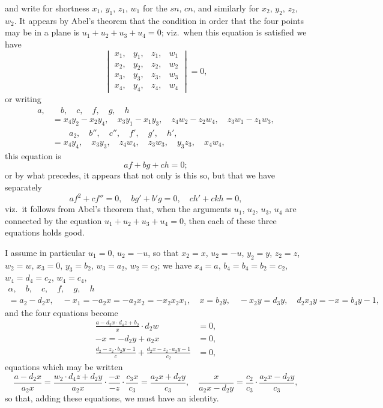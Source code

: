 \documentclass[11pt,a4paper]{book}
\begin{document}
\noindent and write for shortness $x_1$, $y_1$, $z_1$, $w_1$ for the $sn$, $cn$, and similarly for $x_2$, $y_2$, $z_2$, $w_2$. It appears by Abel's theorem that the condition in order that the four points may be in a plane is $u_1 + u_2 + u_3 + u_4 = 0$; viz.\ when this equation is satisfied we have
\[
\begin{vmatrix}
x_1, & y_1, & z_1, & w_1 \\
x_2, & y_2, & z_2, & w_2 \\
x_3, & y_3, & z_3, & w_3 \\
x_4, & y_4, & z_4, & w_4
\end{vmatrix} = 0,
\]
or writing
\begin{align*}
a, & \quad b, \quad c, \quad f, \quad g, \quad h \\
&= x_4 y_2 - x_2 y_4, \quad x_3 y_1 - x_1 y_3, \quad z_4 w_2 - z_2 w_4, \quad z_3 w_1 - z_1 w_3, \\
& \qquad a_2, \quad b'', \quad c'', \quad f', \quad g', \quad h', \\
&= x_4 y_4, \quad x_3 y_3, \quad z_4 w_4, \quad z_3 w_3, \quad y_3 z_3, \quad x_4 w_4,
\end{align*}
this equation is
\[
af + bg + ch = 0;
\]
or by what precedes, it appears that not only is this so, but that we have separately
\[
af^2 + cf'' = 0, \quad bg' + b'g = 0, \quad ch' + ck h = 0,
\]
viz.\ it follows from Abel's theorem that, when the arguments $u_1$, $u_2$, $u_3$, $u_4$ are connected by the equation $u_1 + u_2 + u_3 + u_4 = 0$, then each of these three equations holds good.

I assume in particular $u_1 = 0$, $u_2 = -u$, so that $x_2 = x$, $u_2 = -u$, $y_2 = y$, $z_2 = z$, $w_2 = w$, $x_3 = 0$, $y_3 = b_2$, $w_3 = a_2$, $w_2 = c_2$; we have $x_4 = a$, $b_4 = b_4 = b_2 = c_2$, $w_4 = d_4 = c_2$, $w_4 = c_4$,
\begin{align*}
\alpha, \quad b, \quad c, \quad f, \quad g, \quad h \\
= a_2 - d_2x, \quad -x_1 = -a_2x = -a_2x_2 = -x_2x_2x_1, \quad x = b_2y, \quad -x_2y = d_3y, \quad d_2x_3y = -x = b_4y - 1,
\end{align*}
and the four equations become
\begin{align*}
\frac{a - d_2x \cdot d_4z + b_2}{x} \cdot d_2w &= 0, \\
-x = -d_2y + a_2x &= 0, \\
\frac{d_2 - z_2 \cdot b_2y - 1}{c} + \frac{d_2x - z_2 \cdot a_2y - 1}{c_2} &= 0,
\end{align*}
equations which may be written
\[
\frac{a - d_2x}{a_2x} = \frac{w_2 \cdot d_4z + d_2y}{a_2x} \cdot \frac{-x}{-z} \cdot \frac{c_3x}{c_3} = \frac{a_2x + d_2y}{c_3}, \quad \frac{x}{a_2x - d_2y} = \frac{c_2}{c_3} \cdot \frac{a_2x - d_2y}{c_3},
\]
so that, adding these equations, we must have an identity.
\end{document}
